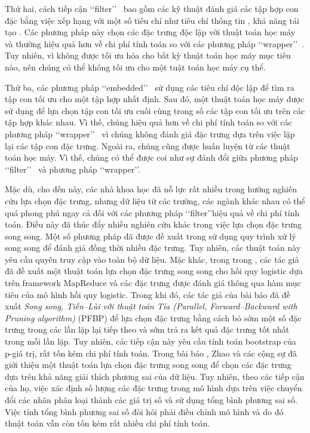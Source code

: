 Thứ hai, cách tiếp cận \lq\lq filter\rq\rq~ bao gồm các kỹ thuật đánh giá các tập hợp con đặc bằng việc xếp hạng với một số tiêu chí như tiêu chí thông tin \cite{nguyen2014efficiency, shishkin2016efficiency}, khả năng tái tạo \cite{farahat2011efficiency, masaeli2010convex}. Các phương pháp này chọn các đặc trưng độc lập với thuật toán học máy và thường hiệu quả hơn về chi phí tính toán so với các phương pháp \lq\lq wrapper\rq\rq~\cite{li2017feature}. Tuy nhiên, vì không được tối ưu hóa cho bất kỳ thuật toán học máy mục tiêu nào, nên chúng có thể không tối ưu cho một tuật toán học máy cụ thể.

Thứ ba, các phương pháp \lq\lq embedded\rq\rq~ sử dụng các tiêu chí độc lập để tìm ra tập con tối ưu cho một tập hợp nhất định. Sau đó, một thuật toán học máy được sử dụng để lựa chọn tập con tối ưu cuối cùng trong số các tập con tối ưu trên các tập hợp khác nhau. Vì thế, chúng hiệu quả hơn về chi phí tính toán so với các phương pháp \lq\lq wrapper\rq\rq~ vì chúng không đánh giá đặc trưng dựa trên việc lặp lại các tập con đặc trưng. Ngoài ra, chúng cũng được huấn luyện từ các thuật toán học máy. Vì thế, chúng có thể được coi như sự đánh đổi giữa phương pháp \lq\lq filter\rq\rq~ và phương pháp \lq\lq wrapper\rq\rq \cite{li2017feature}.

Mặc dù, cho đến này, các nhà khoa học đã nỗ lực rất nhiều trong hướng nghiên cứu lựa chọn đặc trưng, nhưng dữ liệu từ các trường, các ngành khác nhau có thể quá phong phú ngay cả đối với các phương pháp \lq\lq filter\rq\rq hiệu quả về chi phí tính toán. Điều này đã thúc đẩy nhiều nghiên cứu khác trong việc lựa chọn đặc trưng song song. Một số phương pháp đã được đề xuất trong \cite{melab2006grid,de2006parallelizing,garcia2006parallel,guillen2009efficiency,lopez2006solve} sử dụng quy trình xử lý song song để đánh giá đồng thời nhiều đặc trưng. Tuy nhiên, các thuật toán này yêu cầu quyên truy cập vào toàn bộ dữ liệu. Mặc khác, trong trong \cite{singh2009parallel}, các tác giả đã đề xuất một thuật toán lựa chọn đặc trưng song song cho hồi quy logistic dựa trên framework MapReduce và các đặc trưng được đánh giá thông qua hàm mục tiêu của mô hình hồi quy logistic. Trong khi đó, các tác giả của bài báo \cite{tsamardinos2019greedy} đã đề xuất \textit{Song song, Tiến–Lùi với thuật toán Tỉa (Parallel, Forward–Backward with Pruning algorithm)} (PFBP) để lựa chọn đặc trưng bằng cách bỏ sớm một số đặc trưng trong các lần lặp lại tiếp theo và sớm trả ra kết quả đặc trưng tốt nhất trong mỗi lần lặp. Tuy nhiên, các tiếp cận này yêu cầu tính toán bootstrap của p-giá trị, rất tốn kém chi phí tính toán. Trong bài báo \cite{zhao2013massively}, Zhao và các cộng sự đã giới thiệu một thuật toán lựa chọn đặc trưng song song để chọn các đặc trưng dựa trên khả năng giải thích phương sai của dữ liệu. Tuy nhiên, theo các tiếp cận của họ, việc xác định số lượng các đặc trưng trong mô hình dựa trên việc chuyển đổi các nhãn phân loại thành các giá trị số và sử dụng tổng bình phương sai số. Việc tính tổng bình phương sai số đòi hỏi phải điều chỉnh mô hình và do đó thuật toán vẫn còn tốn kém rất nhiều chi phí tính toán.